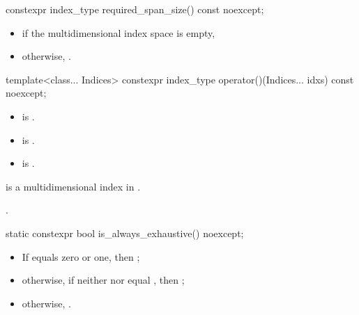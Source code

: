 %
\begin{itemdecl}
constexpr index_type required_span_size() const noexcept;
\end{itemdecl}

\begin{itemdescr}
\pnum
\returns
\begin{itemize}
\item
{} if the multidimensional index space  is empty,
\item
otherwise, .
\end{itemize}
\end{itemdescr}

%
\begin{itemdecl}
template<class... Indices>
  constexpr index_type operator()(Indices... idxs) const noexcept;
\end{itemdecl}

\begin{itemdescr}
\pnum
\constraints
\begin{itemize}
\item
{} is .
\item
{} is .
\item
{} is .
\end{itemize}

\pnum
\expects
{} is
a multidimensional index in .

\pnum
\returns
{}.
\end{itemdescr}

%
\begin{itemdecl}
static constexpr bool is_always_exhaustive() noexcept;
\end{itemdecl}

\begin{itemdescr}
\pnum
\returns
\begin{itemize}
\item
If  equals zero or one, then ;
\item
otherwise, if
neither  nor 
equal ,
then ;
\item
otherwise, .
\end{itemize}
\end{itemdescr}

